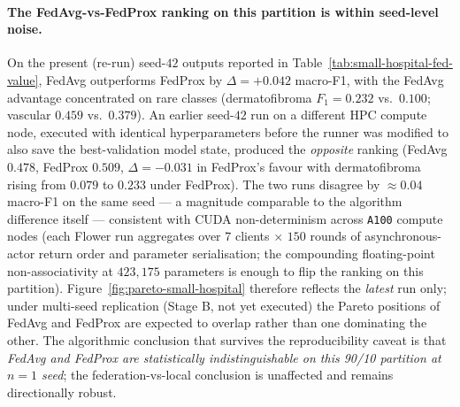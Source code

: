 \documentclass[11pt,a4paper]{report}
\begin{document}
\paragraph{The FedAvg-vs-FedProx ranking on this partition is
within seed-level noise.}
On the present (re-run) seed-$42$ outputs reported in
Table~\ref{tab:small-hospital-fed-value}, FedAvg outperforms FedProx
by $\Delta = +0.042$ macro-F1, with the FedAvg advantage
concentrated on rare classes (dermatofibroma $F_1 = 0.232$ vs.\
$0.100$; vascular $0.459$ vs.\ $0.379$). An earlier seed-$42$ run
on a different HPC compute node, executed with identical
hyperparameters before the runner was modified to also save the
best-validation model state, produced the \emph{opposite} ranking
(FedAvg $0.478$, FedProx $0.509$, $\Delta = -0.031$ in FedProx's
favour with dermatofibroma rising from $0.079$ to $0.233$ under
FedProx). The two runs disagree by $\approx 0.04$ macro-F1 on the
same seed --- a magnitude comparable to the algorithm difference
itself --- consistent with CUDA non-determinism across
\texttt{A100} compute nodes (each Flower run aggregates over $7$
clients $\times$ $150$ rounds of asynchronous-actor return order
and parameter serialisation; the compounding floating-point
non-associativity at $423{,}175$ parameters is enough to flip the
ranking on this partition).
Figure~\ref{fig:pareto-small-hospital} therefore reflects the
\emph{latest} run only; under multi-seed replication (Stage B,
not yet executed) the Pareto positions of FedAvg and FedProx are
expected to overlap rather than one dominating the other. The
algorithmic conclusion that survives the reproducibility caveat is
that \emph{FedAvg and FedProx are statistically indistinguishable on
this 90/10 partition at $n = 1$ seed}; the federation-vs-local
conclusion is unaffected and remains directionally robust.
\end{document}
